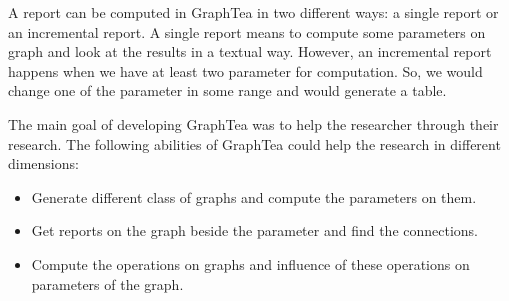 \documentclass[12pt, twoside]{book}
\begin{document}
A report can be computed in GraphTea in two different ways:
a single report or an incremental report.
A single report means to compute some parameters on graph and look at the results
in a textual way. However, an incremental report happens when we have at least
two parameter for computation. So, we would change one of the parameter in
some range and would generate a table.

The main goal of developing GraphTea was to help the researcher through their research.
The following abilities of GraphTea could help the research in different dimensions:
\begin{itemize}
\item Generate different class of graphs and compute the parameters on them.
\item Get reports on the graph beside the parameter and find the connections.
\item Compute the operations on graphs and influence of these operations on parameters
of the graph.
\end{itemize}
\end{document}
